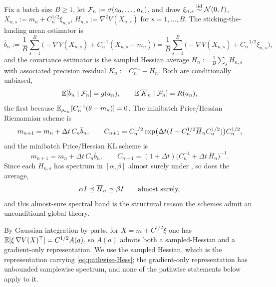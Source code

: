 Fix a batch size $B\geq1$, let $\mathcal{F}_n:=\sigma(a_0,\ldots,a_n)$, and draw
$\xi_{n,s}\overset{\text{iid}}\sim\mathcal{N}(0,I)$, $X_{n,s}:=m_n+C_n^{1/2}\xi_{n,s}$,
$H_{n,s}:=\nabla^2V(X_{n,s})$ for $s=1,\ldots,B$. The sticking-the-landing mean estimator is
\begin{equation}
\label{eq:STL-score}
    \overline b_n:=\frac1B\sum_{s=1}^B\bigl(-\nabla V(X_{n,s})+C_n^{-1}(X_{n,s}-m_n)\bigr)
    =\frac1B\sum_{s=1}^B\bigl(-\nabla V(X_{n,s})+C_n^{-1/2}\xi_{n,s}\bigr),
\end{equation}
and the covariance estimator is the sampled Hessian average $\overline H_n:=\tfrac1B\sum_sH_{n,s}$ with
associated precision residual $\overline K_n:=C_n^{-1}-\overline H_n$. Both are conditionally unbiased,
\begin{equation}
\label{eq:STL-unbiased}
    \mathbb{E}[\overline b_n\mid\mathcal{F}_n]=g(a_n),
    \qquad
    \mathbb{E}[\overline K_n\mid\mathcal{F}_n]=R(a_n),
\end{equation}
the first because $\mathbb{E}_{\rho_{a_n}}[C_n^{-1}(\theta-m_n)]=0$. The minibatch Price/Hessian Riemannian
scheme is
\begin{equation}\label{upd:Riem-stoch}
    m_{n+1}=m_n+\Delta t\,C_n\overline b_n,
    \qquad
    C_{n+1}=C_n^{1/2}\exp\bigl(\Delta t(I-C_n^{1/2}\overline H_nC_n^{1/2})\bigr)C_n^{1/2},
\end{equation}
and the minibatch Price/Hessian KL scheme is
\begin{equation}\label{upd:KL-stoch}
    m_{n+1}=m_n+\Delta t\,C_n\overline b_n,
    \qquad
    C_{n+1}=(1+\Delta t)\bigl(C_n^{-1}+\Delta t\,\overline H_n\bigr)^{-1}.
\end{equation}
Since each $H_{n,s}$ has spectrum in $[\alpha,\beta]$ almost surely under
, so does the average,
\begin{equation}
\label{eq:pathwise-Hess}
    \alpha I\preceq\overline H_n\preceq\beta I\qquad\text{almost surely,}
\end{equation}
and this almost-sure spectral band is the structural reason the schemes admit an unconditional global
theory.

By Gaussian integration by parts, for $X=m+C^{1/2}\xi$ one has $\mathbb{E}[\xi\,\nabla V(X)^\top]=C^{1/2}A(a)$,
so $A(a)$ admits both a sampled-Hessian and a gradient-only representation. We use the sampled
Hessian, which is the representation carrying \eqref{eq:pathwise-Hess}; the gradient-only
representation has unbounded samplewise spectrum, and none of the pathwise statements below apply to
it.

